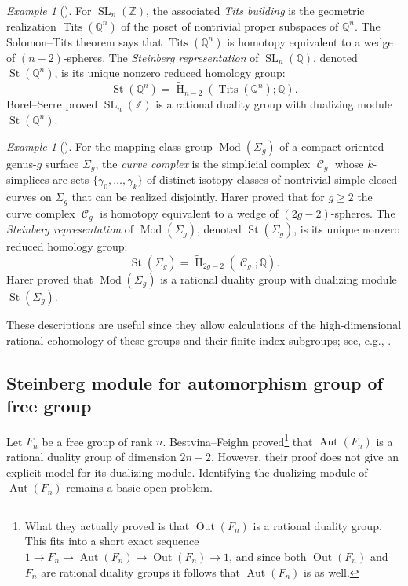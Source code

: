 \documentclass[11pt]{amsart}
\numberwithin{equation}{section}
\theoremstyle{plain}
\theoremstyle{definition}
\theoremstyle{remark}
\newtheorem{eg}[theorem]{Example}
\newenvironment{example}[1][]{\begin{eg}[#1] \pushQED{\qed}}{\popQED \end{eg}}
\DeclareMathOperator{\SL}{SL}
\newcommand\Z{\ensuremath{\mathbb{Z}}}
\newcommand\Q{\ensuremath{\mathbb{Q}}}
\DeclareMathOperator{\HH}{H}
\newcommand\RH{\ensuremath{\widetilde{\HH}}}
\DeclareMathOperator{\Aut}{Aut}
\DeclareMathOperator{\Out}{Out}
\DeclareMathOperator{\Tits}{Tits}
\DeclareMathOperator{\St}{St}
\DeclareMathOperator{\Mod}{Mod}
\DeclareMathOperator{\Curves}{\mathcal{C}}
\begin{document}
\begin{example}
For $\SL_n(\Z)$, the associated {\em Tits building} is the geometric realization $\Tits(\Q^n)$ of
the poset of nontrivial proper subspaces of $\Q^n$.  The Solomon--Tits theorem \cite{SolomonTits} says that
$\Tits(\Q^n)$ is homotopy equivalent to a wedge of $(n-2)$-spheres.  The {\em Steinberg representation}
of $\SL_n(\Q)$, denoted $\St(\Q^n)$, is its unique nonzero reduced homology group:
\[\St(\Q^n) = \RH_{n-2}(\Tits(\Q^n);\Q).\]
Borel--Serre \cite{BorelSerre} proved $\SL_n(\Z)$ is a rational duality group with dualizing module $\St(\Q^n)$.
\end{example}

\begin{example}
For the mapping class group $\Mod(\Sigma_g)$ of a compact oriented genus-$g$ surface $\Sigma_g$, the {\em curve complex}
is the simplicial complex $\Curves_g$ whose $k$-simplices are sets $\{\gamma_0,\ldots,\gamma_k\}$ of distinct isotopy classes
of nontrivial simple closed curves on $\Sigma_g$ that can be realized disjointly.  Harer \cite{HarerDuality} proved
that for $g \geq 2$ the curve complex $\Curves_g$ is homotopy equivalent to a wedge of $(2g-2)$-spheres.  The
{\em Steinberg representation} of $\Mod(\Sigma_g)$, denoted $\St(\Sigma_g)$, is its unique nonzero reduced homology group:
\[\St(\Sigma_g) = \RH_{2g-2}(\Curves_g;\Q).\]
Harer \cite{HarerDuality} proved that $\Mod(\Sigma_g)$ is a rational duality group with dualizing module $\St(\Sigma_g)$.
\end{example}

These descriptions are useful since they allow calculations of the high-dimensional rational cohomology of
these groups and their finite-index subgroups; see, e.g.,
\cite{ChurchFarbPutmanVanish, ChurchFarbPutmanGL, ChurchPutmanCodim1, FullartonPutman, LeeSzczarba, MillerNagpalPatzt, MillerPatztPutman}.

\subsection{Steinberg module for automorphism group of free group}
Let $F_n$ be a free group of rank $n$.  Bestvina--Feighn \cite{BestvinaFeighnDuality} proved\footnote{What they actually
proved is that $\Out(F_n)$ is a rational duality group.  This fits into a short exact sequence
$1 \rightarrow F_n \rightarrow \Aut(F_n) \rightarrow \Out(F_n) \rightarrow 1$, and since both $\Out(F_n)$ and
$F_n$ are rational duality groups it follows that $\Aut(F_n)$ is as well.}
that $\Aut(F_n)$ is a rational
duality group of dimension $2n-2$.  However, their proof does not give an explicit model for its dualizing module.  Identifying
the dualizing module of $\Aut(F_n)$ remains a basic open problem.
\end{document}
